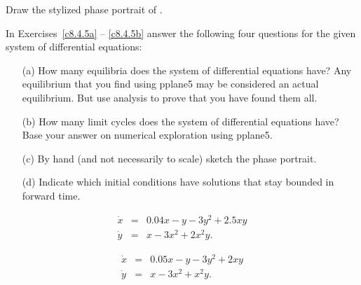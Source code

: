 \documentclass{ximera}
\begin{document}
\begin{exercise} \label{c8.4.4}
Draw the stylized phase portrait of .
\end{exercise}

\noindent In Exercises~\ref{c8.4.5a} -- \ref{c8.4.5b} answer the following 
four questions for the given system of differential equations:
\begin{itemize}
\item[(a)]  How many equilibria does the system of differential equations 
have?  Any equilibrium that you find using {\sf pplane5} may be considered an 
actual equilibrium.  But use analysis to prove that you have found them all.
\item[(b)]  How many limit cycles does the system of differential equations 
have?  Base your answer on numerical exploration using {\sf pplane5}.
\item[(c)]  By hand (and not necessarily to scale) sketch the phase portrait.
\item[(d)]  Indicate which initial conditions have solutions that stay
bounded in forward time.
\end{itemize}
\begin{exercise}  \label{c8.4.5a}
\begin{equation*} 
\begin{array}{rcl}
\dot{x} & = & 0.04x - y - 3y^2 + 2.5xy\\
\dot{y} & = & x - 3x^2 + 2x^2y.
\end{array}
\end{equation*}
\end{exercise}
\begin{exercise}  \label{c8.4.5b}
\begin{equation*} 
\begin{array}{rcl}
\dot{x} & = & 0.05x - y - 3y^2 + 2xy \\
\dot{y} & = & x - 3x^2 + x^2y.
\end{array}
\end{equation*}
\end{exercise}
\end{document}
